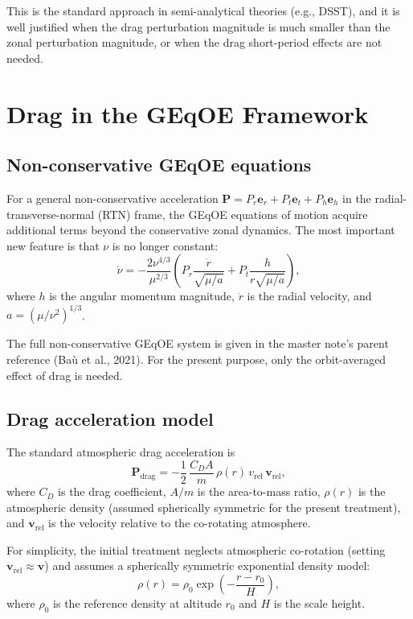 \documentclass[11pt]{article}
\begin{document}
This is the standard approach in semi-analytical theories (e.g., DSST), and
it is well justified when the drag perturbation magnitude is much smaller
than the zonal perturbation magnitude, or when the drag short-period effects
are not needed.


\section{Drag in the GEqOE Framework}

\subsection{Non-conservative GEqOE equations}

For a general non-conservative acceleration
$\bm P = P_r \bm e_r + P_t \bm e_t + P_h \bm e_h$
in the radial-transverse-normal (RTN) frame, the GEqOE equations of motion
acquire additional terms beyond the conservative zonal dynamics. The most
important new feature is that $\nu$ is no longer constant:
\begin{equation}
\dot\nu = -\frac{2\nu^{4/3}}{\mu^{2/3}}
\left(P_r \frac{\dot r}{\sqrt{\mu/a}} + P_t \frac{h}{r\sqrt{\mu/a}}\right),
\label{eq:nudot_general}
\end{equation}
where $h$ is the angular momentum magnitude, $\dot r$ is the radial
velocity, and $a = (\mu/\nu^2)^{1/3}$.

The full non-conservative GEqOE system is given in the master note's
parent reference (Ba\`u et al., 2021). For the present purpose, only the
orbit-averaged effect of drag is needed.

\subsection{Drag acceleration model}

The standard atmospheric drag acceleration is
\begin{equation}
\bm P_{\mathrm{drag}}
= -\frac{1}{2}\,\frac{C_D A}{m}\,\rho(r)\,v_{\mathrm{rel}}\,
\bm v_{\mathrm{rel}},
\label{eq:drag_accel}
\end{equation}
where $C_D$ is the drag coefficient, $A/m$ is the area-to-mass ratio,
$\rho(r)$ is the atmospheric density (assumed spherically symmetric for the
present treatment), and $\bm v_{\mathrm{rel}}$ is the velocity relative to
the co-rotating atmosphere.

For simplicity, the initial treatment neglects atmospheric co-rotation
(setting $\bm v_{\mathrm{rel}} \approx \bm v$) and assumes a spherically
symmetric exponential density model:
\begin{equation}
\rho(r) = \rho_0 \exp\!\left(-\frac{r - r_0}{H}\right),
\label{eq:density_exp}
\end{equation}
where $\rho_0$ is the reference density at altitude $r_0$ and $H$ is the
scale height.
\end{document}
